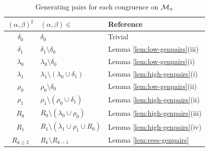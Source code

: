 \begin{table}[ht]
  \renewcommand\arraystretch{1.0}
  \centering
  \begin{tabular}{| c | l | l |}
    \hline
    $(\alpha,\beta)^\sharp$ & $(\alpha,\beta) \in$ & Reference \\
    \hline
    $\delta_0$   & $\delta_0$
                 & Trivial                             \\
    $\delta_1$   & $\delta_1 \setminus \delta_0$
                 & Lemma \ref{lem:low-genpairs}(iii)  \\
    $\lambda_0$  & $\lambda_0 \setminus \delta_0$
                 & Lemma \ref{lem:low-genpairs}(i)    \\
    $\lambda_1$  & $\lambda_1 \setminus (\lambda_0 \cup \delta_1)$
                 & Lemma \ref{lem:high-genpairs}(i)   \\
    $\rho_0$     & $\rho_0 \setminus \delta_0$
                 & Lemma \ref{lem:low-genpairs}(ii)   \\
    $\rho_1$     & $\rho_1 \setminus (\rho_0 \cup \delta_1)$
                 & Lemma \ref{lem:high-genpairs}(ii)  \\
    $R_0$        & $R_0 \setminus (\lambda_0 \cup \rho_0)$
                 & Lemma \ref{lem:high-genpairs}(iii) \\
    $R_1$        & $R_1 \setminus (\lambda_1 \cup \rho_1 \cup R_0)$
                 & Lemma \ref{lem:high-genpairs}(iv)  \\
    $R_{k \geq 2}$ & $R_k \setminus R_{k-1}$
                 & Lemma \ref{lem:rees-genpairs}       \\
    \hline
  \end{tabular}
  \caption{Generating pairs for each congruence on $\mathcal{M}_n$}
  \label{tab:mn-genpairs}
\end{table}

